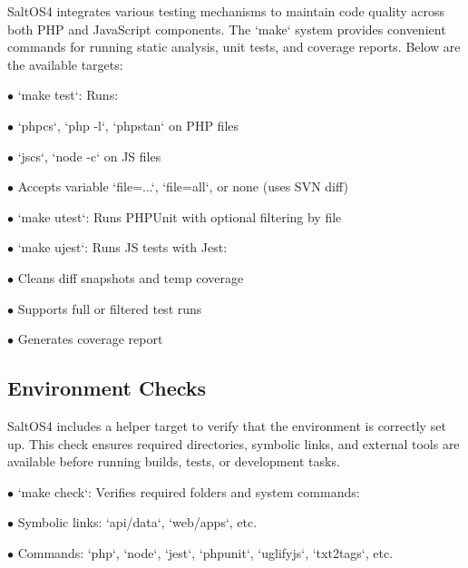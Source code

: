 \documentclass[a4paper]{article}
\begin{document}
SaltOS4 integrates various testing mechanisms to maintain code quality across both PHP and JavaScript components. The `make` system provides convenient commands for running static analysis, unit tests, and coverage reports. Below are the available targets:

\begin{compactitem}
\item[\color{myblue}$\bullet$] `make test`: Runs:
  \begin{compactitem}
  \item[\color{myblue}$\bullet$] `phpcs`, `php -l`, `phpstan` on PHP files
  \item[\color{myblue}$\bullet$] `jscs`, `node -c` on JS files
  \item[\color{myblue}$\bullet$] Accepts variable `file=...`, `file=all`, or none (uses SVN diff)
  \end{compactitem}
\item[\color{myblue}$\bullet$] `make utest`: Runs PHPUnit with optional filtering by file
\item[\color{myblue}$\bullet$] `make ujest`: Runs JS tests with Jest:
  \begin{compactitem}
  \item[\color{myblue}$\bullet$] Cleans diff snapshots and temp coverage
  \item[\color{myblue}$\bullet$] Supports full or filtered test runs
  \item[\color{myblue}$\bullet$] Generates coverage report
  \end{compactitem}
\end{compactitem}

\hypertarget{toc62}{}
\subsection{Environment Checks}

SaltOS4 includes a helper target to verify that the environment is correctly set up. This check ensures required directories, symbolic links, and external tools are available before running builds, tests, or development tasks.

\begin{compactitem}
\item[\color{myblue}$\bullet$] `make check`: Verifies required folders and system commands:
  \begin{compactitem}
  \item[\color{myblue}$\bullet$] Symbolic links: `api/data`, `web/apps`, etc.
  \item[\color{myblue}$\bullet$] Commands: `php`, `node`, `jest`, `phpunit`, `uglifyjs`, `txt2tags`, etc.
  \end{compactitem}
\end{compactitem}
\end{document}
